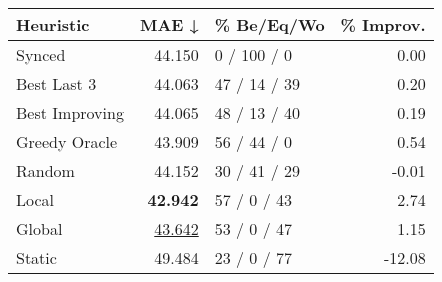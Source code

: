 \begin{tabular}{lrlr}
\toprule
\textbf{Heuristic} & \textbf{MAE ↓} & \textbf{\% Be/Eq/Wo} & \textbf{\% Improv.} \\
\midrule
            Synced &         44.150 &          0 / 100 / 0 &                0.00 \\
\midrule
       Best Last 3 &         44.063 &         47 / 14 / 39 &                0.20 \\
    Best Improving &         44.065 &         48 / 13 / 40 &                0.19 \\
\addlinespace
     Greedy Oracle &         43.909 &          56 / 44 / 0 &                0.54 \\
            Random &         44.152 &         30 / 41 / 29 &               -0.01 \\
\midrule
             Local &         \textbf{42.942} &          57 / 0 / 43 &                2.74 \\
            Global &         \underline{43.642} &          53 / 0 / 47 &                1.15 \\
\midrule
            Static &         49.484 &          23 / 0 / 77 &              -12.08 \\
\bottomrule
\end{tabular}

\label{tab:iid_lr01_le1_bs2_Summary}
